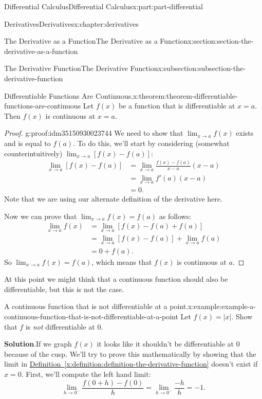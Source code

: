 \documentclass[twoside,10pt,]{book}
\newcommand{\blocktitlefont}{\relax}
\newcommand{\xreffont}{\relax}
\numberwithin{equation}{part}
\begin{document}
\begin{partptx}{Differential Calculus}{}{Differential Calculus}{}{}{x:part:part-differential}
\begin{chapterptx}{Derivatives}{}{Derivatives}{}{}{x:chapter:derivatives}
\begin{sectionptx}{The Derivative as a Function}{}{The Derivative as a Function}{}{}{x:section:section-the-derivative-as-a-function}
\begin{subsectionptx}{The Derivative Function}{}{The Derivative Function}{}{}{x:subsection:subsection-the-derivative-function}
\begin{theorem}{Differentiable Functions Are Continuous.}{}{x:theorem:theorem-differentiable-functions-are-continuous}%
Let \(f(x)\) be a function that is differentiable at \(x=a\). Then \(f(x)\) is continuous at \(x=a\).%
\end{theorem}
\begin{proof}{}{g:proof:idm35150930023744}
We need to show that \(\lim_{x\to a}f(x)\) exists and is equal to \(f(a)\). To do this, we'll start by considering (somewhat counterintuitively) \(\lim_{x\to a}[f(x)-f(a)]\):%
\begin{align*}
\lim_{x\to a}[f(x)-f(a)] & = \lim_{x\to a}\frac{f(x)-f(a)}{x-a}(x-a) \\
& = \lim_{x\to a}f'(a)(x-a) \\
& = 0. 
\end{align*}
Note that we are using our alternate definition of the derivative here.%
\par
Now we can prove that \(\lim_{x\to a}f(x) = f(a)\) as follows:%
\begin{align*}
\lim_{x\to a}f(x) & = \lim_{x\to a}[f(x) - f(a) + f(a)] \\
& = \lim_{x\to a}[f(x)-f(a)] + \lim_{x\to a}f(a) \\
& = 0 + f(a). 
\end{align*}
So \(\lim_{x\to a}f(x) = f(a)\), which means that \(f(x)\) is continuous at \(a\).%
\end{proof}
At this point we might think that a continuous function should also be differentiable, but this is not the case.%
\begin{example}{A continuous function that is not differentiable at a point.}{x:example:example-a-continuous-function-that-is-not-differentiable-at-a-point}%
Let \(f(x) = |x|\). Show that \(f\) is \emph{not} differentiable at \(0\).%
\par\smallskip%
\noindent\textbf{\blocktitlefont Solution}.\hypertarget{g:solution:idm35150930080960}{}\quad{}If we graph \(f(x)\) it looks like it shouldn't be differentiable at \(0\) because of the cusp. We'll try to prove this mathematically by showing that the limit in \hyperref[x:definition:definition-the-derivative-function]{Definition~{\xreffont\ref{x:definition:definition-the-derivative-function}}} doesn't exist if \(x=0\). First, we'll compute the left hand limit:%
\begin{equation*}
\lim_{h\to0^{-}}\frac{f(0+h)-f(0)}{h} = \lim_{h\to0^{-}}\frac{-h}{h} = -1.
\end{equation*}

\end{example}
\end{subsectionptx}
\end{sectionptx}
\end{chapterptx}
\end{partptx}
\end{document}

